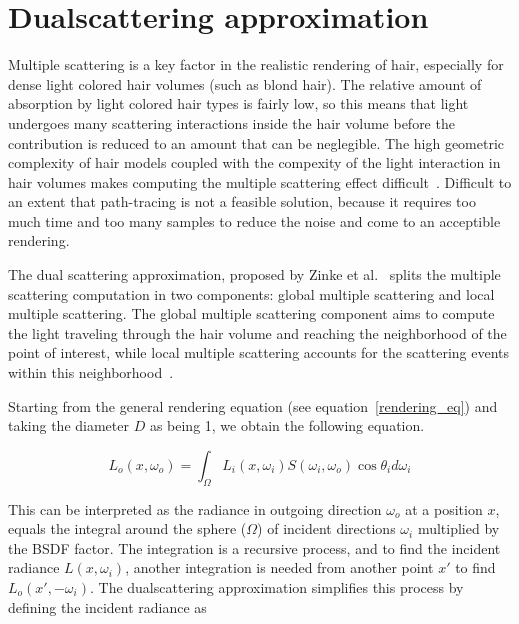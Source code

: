 \section{Dualscattering approximation}
\label{sec_dualscattering}

Multiple scattering is a key factor in the realistic rendering of hair, especially for dense light colored hair volumes (such as blond hair). The relative amount of absorption by light colored hair types is fairly low, so this means that light undergoes many scattering interactions inside the hair volume before the contribution is reduced to an amount that can be neglegible. The high geometric complexity of hair models coupled with the compexity of the light interaction in hair volumes makes computing the multiple scattering effect difficult~\cite{zinke}. Difficult to an extent that path-tracing is not a feasible solution, because it requires too much time and too many samples to reduce the noise and come to an acceptible rendering.

The dual scattering approximation, proposed by Zinke et al.~\cite{zinke} splits the multiple scattering computation in two components: global multiple scattering and local multiple scattering. The global multiple scattering component aims to compute the light traveling through the hair volume and reaching the neighborhood of the point of interest, while local multiple scattering accounts for the scattering events within this neighborhood~\cite{zinke}.

%
%

Starting from the general rendering equation (see equation~\ref{rendering_eq}) and taking the diameter $D$ as being 1, we obtain the following equation.

\begin{equation}
L_o(x, \omega_o) = \int_{\Omega} L_i(x, \omega_i) S(\omega_i, \omega_o) \cos \theta_i d\omega_i
\end{equation}

This can be interpreted as the radiance in outgoing direction $\omega_o$ at a position $x$, equals the integral around the sphere ($\Omega$) of incident directions $\omega_i$ multiplied by the BSDF factor. The integration is a recursive process, and to find the incident radiance $L(x, \omega_i)$, another integration is needed from another point $x'$ to find $L_o(x', -\omega_i)$. The dualscattering approximation simplifies this process by defining the incident radiance as


